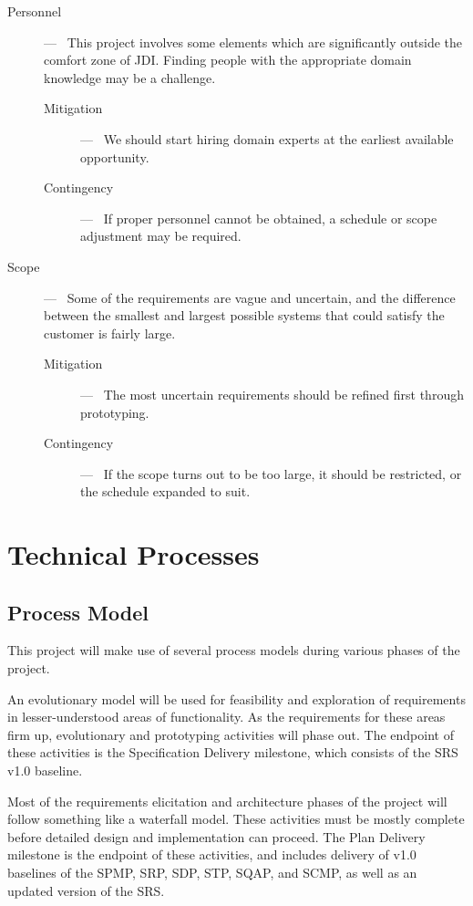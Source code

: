 \documentclass[11pt]{article}
\begin{document}
\begin{description}
\item[Personnel] ---~ This project involves some elements which are significantly outside the comfort
  zone of JDI.  Finding people with the appropriate domain knowledge may be a challenge.
  \begin{description}
  \item[Mitigation] ---~ We should start hiring domain experts at the earliest available opportunity.
  \item[Contingency] ---~ If proper personnel cannot be obtained, a schedule or scope adjustment may
    be required.
  \end{description}
\item[Scope] ---~ Some of the requirements are vague and uncertain, and the difference between the
  smallest and largest possible systems that could satisfy the customer is fairly large.
  \begin{description}
  \item[Mitigation] ---~ The most uncertain requirements should be refined first through prototyping.
  \item[Contingency] ---~ If the scope turns out to be too large, it should be restricted, or the
    schedule expanded to suit.
  \end{description}
\end{description}



\section{Technical Processes}
\subsection{Process Model}
This project will make use of several process models during various phases of the project.

An evolutionary model will be used for feasibility and exploration of requirements in
lesser-understood areas of functionality.  As the requirements for these areas firm up, evolutionary
and prototyping activities will phase out.  The endpoint of these activities is the Specification
Delivery milestone, which consists of the SRS v1.0 baseline.

Most of the requirements elicitation and architecture phases of the project will follow something
like a waterfall model.  These activities must be mostly complete before detailed design and
implementation can proceed.  The Plan Delivery milestone is the endpoint of these activities, and
includes delivery of v1.0 baselines of the SPMP, SRP, SDP, STP, SQAP, and SCMP, as well as an
updated version of the SRS.
\end{document}
